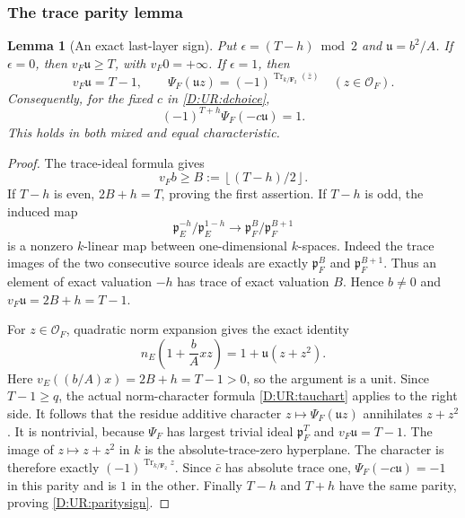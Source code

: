 \documentclass[11pt]{amsart}
\newtheorem{lemma}[theorem]{Lemma}
\theoremstyle{definition}
\theoremstyle{remark}
\newcommand{\F}{\mathbf F}
\newcommand{\Tr}{\operatorname{Tr}}
\newcommand{\floor}[1]{\left\lfloor #1\right\rfloor}
\newcommand{\OO}{\mathcal O}\newcommand{\pp}{\mathfrak p}\newcommand{\PP}{\mathfrak P}
\begin{document}
\subsubsection*{The trace parity lemma}
\begin{lemma}[An exact last-layer sign]\label{D:UR:traceparity}
Put $\epsilon=(T-h)\bmod2$ and $\mathfrak u=b^2/A$.
If $\epsilon=0$, then $v_F\mathfrak u\ge T$, with $v_F0=+\infty$.
If $\epsilon=1$, then
\[
 v_F\mathfrak u=T-1,\qquad
 \Psi_F(\mathfrak u z)=(-1)^{\Tr_{k/\F_2}(\bar z)}
 \quad(z\in\OO_F).
\]
Consequently, for the fixed $c$ in \eqref{D:UR:dchoice},
\begin{equation}\label{D:UR:paritysign}
 (-1)^{T+h}\Psi_F(-c\mathfrak u)=1.
\end{equation}
This holds in both mixed and equal characteristic.
\end{lemma}
\begin{proof}
The trace-ideal formula gives
\[
 v_Fb\ge B:=\floor{(T-h)/2}.
\]
If $T-h$ is even, $2B+h=T$, proving the first assertion.
If $T-h$ is odd, the induced map
\[
 \pp_E^{-h}/\pp_E^{1-h}
 \longrightarrow \pp_F^B/\pp_F^{B+1}
\]
is a nonzero $k$-linear map between one-dimensional $k$-spaces.
Indeed the trace images of the two consecutive source ideals are exactly
$\pp_F^B$ and $\pp_F^{B+1}$. Thus an element of exact valuation $-h$
has trace of exact valuation $B$. Hence $b\ne0$ and
$v_F\mathfrak u=2B+h=T-1$.

For $z\in\OO_F$, quadratic norm expansion gives the exact identity
\begin{equation}\label{D:UR:traceparitynorm}
 n_E\!\left(1+\frac bA xz\right)
       =1+\mathfrak u(z+z^2).
\end{equation}
Here $v_E((b/A)x)=2B+h=T-1>0$, so the argument is a unit.
Since $T-1\ge q$, the actual norm-character formula
\eqref{D:UR:tauchart} applies to the right side. It follows that the residue
additive character $z\mapsto\Psi_F(\mathfrak u z)$ annihilates
$z+z^2$. It is nontrivial, because $\Psi_F$ has largest trivial ideal
$\pp_F^T$ and $v_F\mathfrak u=T-1$. The image of $z\mapsto z+z^2$
in $k$ is the absolute-trace-zero hyperplane. The character is therefore
exactly $(-1)^{\Tr_{k/\F_2}z}$. Since $\bar c$ has absolute trace one,
$\Psi_F(-c\mathfrak u)=-1$ in this parity and is $1$ in the other.
Finally $T-h$ and $T+h$ have the same parity, proving \eqref{D:UR:paritysign}.
\end{proof}
\end{document}
